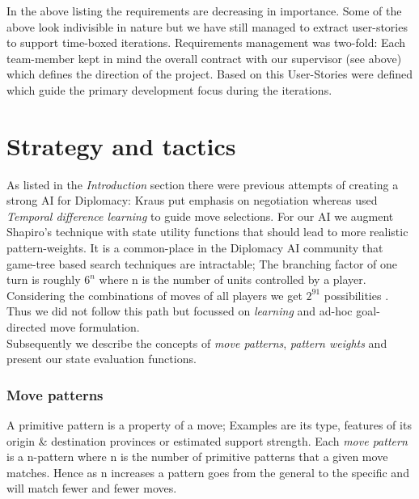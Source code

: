 \documentclass[pdftex,12pt,a4paper]{report}
\begin{document}
In the above listing the requirements are decreasing in
importance. Some of the above look indivisible in nature but we have
still managed to extract user-stories to support time-boxed
iterations. Requirements management was two-fold: Each
team-member kept in mind the overall contract with our supervisor (see
above) which defines the direction of the project.  Based on this
User-Stories were defined which guide the primary development focus
during the iterations.


\pagebreak

\section{Strategy and tactics}

As listed in the \textit{Introduction} section there were previous
attempts of creating a strong AI for Diplomacy: Kraus \cite{Kraus95}
put emphasis on negotiation whereas \cite{Shapiro02} used
\textit{Temporal difference learning} to guide move selections. For
our AI we augment Shapiro's technique with state utility functions
that should lead to more realistic pattern-weights. It is a
common-place in the Diplomacy AI community that game-tree based search
techniques are intractable; The branching factor of one turn
is roughly $6^{n}$ where n is the number of units controlled by a
player. Considering the combinations of moves of all players we get
$2^{91}$ possibilities \cite{Shapiro02}. Thus we did not follow this
path but focussed on \textit{learning} and ad-hoc goal-directed move
formulation. \\

Subsequently we describe the concepts of \textit{move patterns},
\textit{pattern weights} and present our state evaluation functions.

\subsubsection{Move patterns}

A primitive pattern is a property of a move; Examples are its type,
features of its origin \& destination provinces or estimated support
strength. Each \textit{move pattern} is a n-pattern where n is the
number of primitive patterns that a given move matches. Hence as n
increases a pattern goes from the general to the specific and will
match fewer and fewer moves. \\
\end{document}

